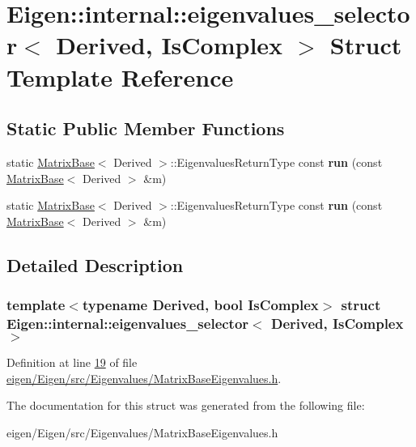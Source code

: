 \hypertarget{struct_eigen_1_1internal_1_1eigenvalues__selector}{}\section{Eigen\+:\+:internal\+:\+:eigenvalues\+\_\+selector$<$ Derived, Is\+Complex $>$ Struct Template Reference}
\label{struct_eigen_1_1internal_1_1eigenvalues__selector}
\subsection*{Static Public Member Functions}
\begin{DoxyCompactItemize}
\item 
\mbox{\label{struct_eigen_1_1internal_1_1eigenvalues__selector_a09979658def7adc9dd8e296689345519}} 
static \hyperlink{group___core___module_class_eigen_1_1_matrix_base}{Matrix\+Base}$<$ Derived $>$\+::Eigenvalues\+Return\+Type const {\bfseries run} (const \hyperlink{group___core___module_class_eigen_1_1_matrix_base}{Matrix\+Base}$<$ Derived $>$ \&m)
\item 
\mbox{\label{struct_eigen_1_1internal_1_1eigenvalues__selector_a09979658def7adc9dd8e296689345519}} 
static \hyperlink{group___core___module_class_eigen_1_1_matrix_base}{Matrix\+Base}$<$ Derived $>$\+::Eigenvalues\+Return\+Type const {\bfseries run} (const \hyperlink{group___core___module_class_eigen_1_1_matrix_base}{Matrix\+Base}$<$ Derived $>$ \&m)
\end{DoxyCompactItemize}


\subsection{Detailed Description}
\subsubsection*{template$<$typename Derived, bool Is\+Complex$>$\newline
struct Eigen\+::internal\+::eigenvalues\+\_\+selector$<$ Derived, Is\+Complex $>$}



Definition at line \hyperlink{eigen_2_eigen_2src_2_eigenvalues_2_matrix_base_eigenvalues_8h_source_l00019}{19} of file \hyperlink{eigen_2_eigen_2src_2_eigenvalues_2_matrix_base_eigenvalues_8h_source}{eigen/\+Eigen/src/\+Eigenvalues/\+Matrix\+Base\+Eigenvalues.\+h}.



The documentation for this struct was generated from the following file\+:\begin{DoxyCompactItemize}
\item 
eigen/\+Eigen/src/\+Eigenvalues/\+Matrix\+Base\+Eigenvalues.\+h\end{DoxyCompactItemize}
